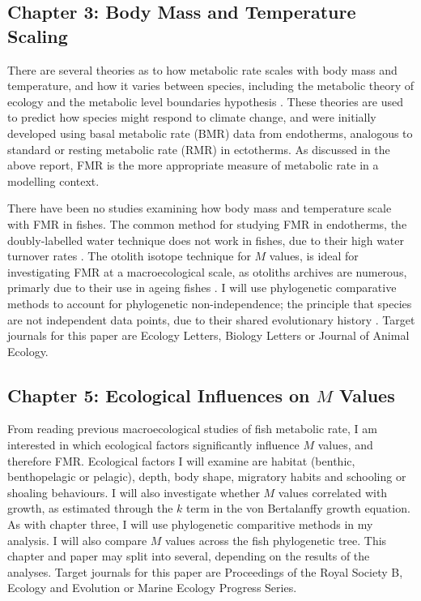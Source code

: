 \documentclass[12pt, titlepage]{article}
\begin{document}
\subsection{Chapter 3: Body Mass and Temperature Scaling}

There are several theories as to how metabolic rate scales with body mass and temperature, and how it varies between species, including the metabolic theory of ecology \citep{Brown2004} and the metabolic level boundaries hypothesis \citep{Glazier2005}.
These theories are used to predict how species might respond to climate change, and were initially developed using basal metabolic rate (BMR) data from endotherms, analogous to standard or resting metabolic rate (RMR) in ectotherms.
As discussed in the above report, FMR is the more appropriate measure of metabolic rate in a modelling context.

There have been no studies examining how body mass and temperature scale with FMR in fishes. 
The common method for studying FMR in endotherms, the doubly-labelled water technique does not work in fishes, due to their high water turnover rates \citep{Treberg2016}.
The otolith isotope technique for $M$ values, is ideal for investigating FMR at a macroecological scale, as otoliths archives are numerous, primarly due to their use in ageing fishes \citep{Campana1998}.
I will use phylogenetic comparative methods to account for phylogenetic non-independence; the principle that species are not independent data points, due to their shared evolutionary history \citep{Harvey1991}.
Target journals for this paper are Ecology Letters, Biology Letters or Journal of Animal Ecology.

\subsection{Chapter 5: Ecological Influences on $M$ Values}

From reading previous macroecological studies of fish metabolic rate, I am interested in which ecological factors significantly influence $M$ values, and therefore FMR.
Ecological factors I will examine are habitat (benthic, benthopelagic or pelagic), \citep{Killen2010, Killen2016}
depth, \citep{Drazen2007, Seibel2007, Killen2010, Killen2016}
body shape, \citep{Uyeda2017, Sherwood2003}
migratory habits and schooling or shoaling behaviours.
I will also investigate whether $M$ values correlated with growth, as estimated through the $k$ term in the von Bertalanffy growth equation.
As with chapter three, I will use phylogenetic comparitive methods in my analysis.
I will also compare $M$ values across the fish phylogenetic tree.
This chapter and paper may split into several, depending on the results of the analyses.
Target journals for this paper are Proceedings of the Royal Society B, Ecology and Evolution or Marine Ecology Progress Series.
\end{document}
